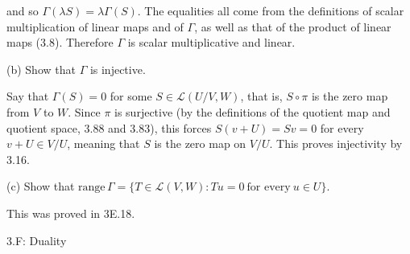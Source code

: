 \documentclass{book}
\begin{document}
\begin{enumerate}
and so \(\Gamma(\lambda S)=\lambda \Gamma(S)\).  The equalities all come from the definitions of scalar multiplication of linear maps and of \(\Gamma\), as well as that of the product of linear maps (3.8).  Therefore \(\Gamma\) is scalar multiplicative and linear.

(b) Show that \(\Gamma\) is injective.

Say that \(\Gamma(S)=0\) for some \(S \in \mathcal{L}(U/V,W)\), that is, \(S \circ \pi\) is the zero map from \(V\) to \(W\).  Since \(\pi\) is surjective (by the definitions of the quotient map and quotient space, 3.88 and 3.83), this forces \(S(v+U)=Sv=0\) for every \(v+U \in V/U\), meaning that \(S\) is the zero map on \(V/U\).  This proves injectivity by 3.16.

(c) Show that \(\textrm{range} \, \Gamma=\{T \in \mathcal{L}(V,W): Tu=0 \ \textrm{for every} \ u \in U\}\).

This was proved in 3E.18.

\end{enumerate}

3.F: Duality
\end{document}
